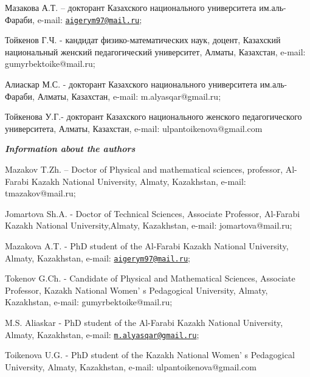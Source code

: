 Мазакова А.Т. -- докторант Казахского национального университета
им.аль-Фараби, e-mail:
\href{mailto:aigerym97@mail.ru}{\nolinkurl{aigerym97@mail.ru}};

Тойкенов Г.Ч. - кандидат физико-математических наук, доцент, Казахский
национальный женский педагогический университет, Алматы, Казахстан,
e-mail: gumyrbektoike@mail.ru;

Алиаскар М.С. - докторант Казахского национального университета
им.аль-Фараби, Алматы, Казахстан, e-mail: m.alyasqar@gmail.ru;

Тойкенова У.Г.- докторант Казахского национального женского
педагогического университета, Алматы, Казахстан, e-mail:
ulpantoikenova@gmail.com

\emph{{\bfseries Information about the authors}}

Mazakov T.Zh. -- Doctor of Physical and mathematical sciences,
professor, Al-Farabi Kazakh National University, Almaty, Kazakhstan,
e-mail: tmazakov@mail.ru;

Jomartova Sh.A. - Doctor of Technical Sciences, Associate Professor,
Al-Farabi Kazakh National University,Almaty, Kazakhstan, e-mail:
jomartova@mail.ru;

Mazakova A.T. - PhD student of the Al-Farabi Kazakh National University,
Almaty, Kazakhstan, e-mail:
\href{mailto:aigerym97@mail.ru}{\nolinkurl{aigerym97@mail.ru}};

Tokenov G.Ch. - Candidate of Physical and Mathematical Sciences,
Associate Professor, Kazakh National Women' s Pedagogical
University, Almaty, Kazakhstan, e-mail: gumyrbektoike@mail.ru;

M.S. Aliaskar - PhD student of the Al-Farabi Kazakh National University,
Almaty, Kazakhstan, e-mail:
\href{mailto:m.alyasqar@gmail.ru}{\nolinkurl{m.alyasqar@gmail.ru}};

Toikenova U.G. - PhD student of the Kazakh National
Women' s Pedagogical University, Almaty, Kazakhstan,
e-mail: ulpantoikenova@gmail.com